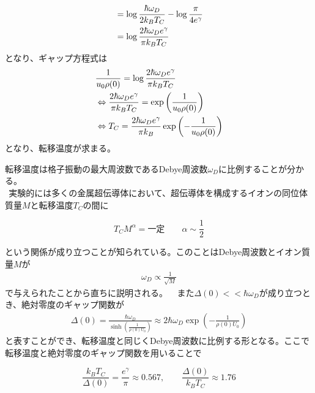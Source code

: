\documentclass[dvipdfmx, 11pt, a4paper]{jsarticle}
\numberwithin{equation}{section}
\theoremstyle{definition}
\begin{document}
\begin{derivationBox}
\begin{align}
            &= \log \frac{\hbar\omega_D}{2k_BT_C} - \log \frac{\pi}{4e^\gamma} \notag \\
            &= \log \frac{2\hbar \omega_D e^\gamma}{\pi k_B T_C}
        \end{align}
        となり、ギャップ方程式は
        \begin{align}
            &\frac{1}{u_0 \rho(0)} = \log \frac{2\hbar \omega_D e^\gamma}{\pi k_B T_C} \notag \\
            &\Leftrightarrow  \frac{2\hbar \omega_D e^\gamma}{\pi k_B T_C} = \exp\left( \frac{1}{u_0 \rho(0)} \right) \notag \\
            &\Leftrightarrow T_C = \frac{2\hbar \omega_D e^\gamma}{\pi k_B} \exp\left( -\frac{1}{u_0 \rho(0)} \right)
        \end{align}
        となり、転移温度が求まる。
    \end{derivationBox}
    転移温度は格子振動の最大周波数であるDebye周波数$\omega_D$に比例することが分かる。\\
    $\ \ $実験的には多くの金属超伝導体において、超伝導体を構成するイオンの同位体質量$M$と転移温度$T_C$の間に
    \begin{note}[同位元素効果]
        \begin{equation}
            T_C M^{\alpha} = \textbf{一定}\qquad \alpha \sim \frac{1}{2}
        \end{equation}
    \end{note}
    という関係が成り立つことが知られている。このことはDebye周波数とイオン質量$M$が
    \begin{align}
        \omega_D \propto \frac{1}{\sqrt{M}}
    \end{align}
    で与えられたことから直ちに説明される。
    $\ \ $ また$\Delta(0) << \hbar \omega_D$が成り立つとき、絶対零度のギャップ関数が
    \begin{align}
         \Delta(0) = \frac{\hbar \omega_D}{\sinh \left( \frac{1}{\rho(0)U_0} \right)} \approx 2\hbar \omega_D \exp \left( -\frac{1}{\rho(0)U_0} \right)
    \end{align}
    と表すことができ、転移温度と同じくDebye周波数に比例する形となる。ここで転移温度と絶対零度のギャップ関数を用いることで
    \begin{definition}[BCS理論における普遍定数]
        \begin{equation}
             \frac{k_B T_C}{\Delta(0)} = \frac{e^{\gamma}}{\pi} \approx 0.567,\qquad \frac{\Delta(0)}{k_B T_C}\approx 1.76
        \end{equation}
    \end{definition}
\end{document}
